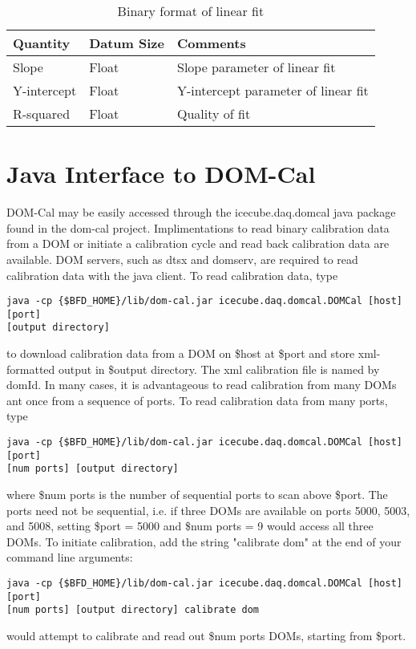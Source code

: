 \documentclass[10pt]{article}
\begin{document}
\begin{table}
\begin{tabular}{|p{4cm}|p{4cm}|p{4cm}|}
\hline
Quantity & Datum Size & Comments \\
\hline
Slope & Float & Slope parameter of linear fit \\
\hline
Y-intercept & Float & Y-intercept parameter of linear fit \\
\hline
R-squared & Float & Quality of fit \\
\hline
\end{tabular}
\caption{Binary format of linear fit}
\label{tbl:linearfit}
\end{table}

\section{Java Interface to DOM-Cal}

DOM-Cal may be easily accessed through the icecube.daq.domcal java package found
in the dom-cal project.  Implimentations to read binary calibration data from a DOM
or initiate a calibration cycle and read back calibration data are available.  DOM
servers, such as dtsx and domserv, are required to read calibration data with the
java client.  To read calibration data, type
\begin{verbatim}
java -cp {$BFD_HOME}/lib/dom-cal.jar icecube.daq.domcal.DOMCal [host] [port]
[output directory]
\end{verbatim}
to download calibration data from a DOM on \$host at \$port and store xml-formatted
output in \$output directory.  The xml calibration file is named by domId.  In many
cases, it is advantageous to read calibration from many DOMs ant once from a sequence
of ports.  To read calibration data from many ports, type
\begin{verbatim}
java -cp {$BFD_HOME}/lib/dom-cal.jar icecube.daq.domcal.DOMCal [host] [port]
[num ports] [output directory]
\end{verbatim}
where \$num ports is the number of sequential ports to scan above \$port.  The ports
need not be sequential, i.e. if three DOMs are available on ports 5000, 5003, and 5008,
setting \$port = 5000 and \$num ports = 9 would access all three DOMs.  To initiate
calibration, add the string "calibrate dom" at the end of your command line arguments:
\begin{verbatim}
java -cp {$BFD_HOME}/lib/dom-cal.jar icecube.daq.domcal.DOMCal [host] [port]
[num ports] [output directory] calibrate dom
\end{verbatim}
would attempt to calibrate and read out \$num ports DOMs, starting from \$port.
\end{document}
